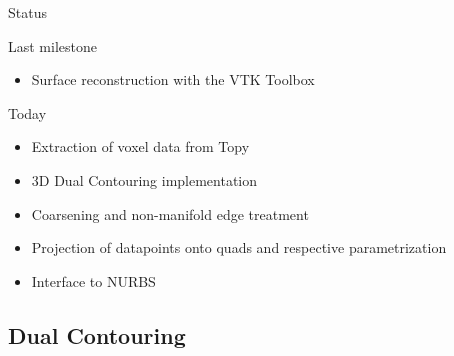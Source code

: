 \begin{frame}{Status}
\begin{block}{Last milestone}
\begin{itemize}
	\item[\textcolor{black}{\VarClock}] Surface reconstruction with the VTK Toolbox

\end{itemize}
\end{block}
\begin{block}{Today}
\begin{itemize}
	\item[\textcolor{green}{\Checkmark}] Extraction of voxel data from Topy
	\item[\textcolor{green}{\Checkmark}] 3D Dual Contouring implementation 
	\item[\textcolor{green}{\Checkmark}] Coarsening and non-manifold edge treatment 
	\item[\textcolor{green}{\Checkmark}] Projection of datapoints onto quads and respective parametrization
	\item[\textcolor{black}{\VarClock}]  Interface to NURBS
\end{itemize}
\end{block}
\end{frame}






\subsection{Dual Contouring}

